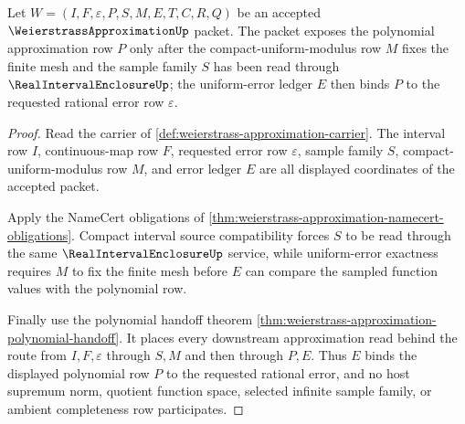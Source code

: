 \begin{theorem}
\label{thm:weierstrass-polynomial-modulus-ledger}
Let $W=(I,F,\varepsilon,P,S,M,E,T,C,R,Q)$ be an accepted $\WeierstrassApproximationUp$ packet. The packet exposes the polynomial approximation row $P$ only after the compact-uniform-modulus row $M$ fixes the finite mesh and the sample family $S$ has been read through $\RealIntervalEnclosureUp$; the uniform-error ledger $E$ then binds $P$ to the requested rational error row $\varepsilon$.
\end{theorem}
\begin{proof}
Read the carrier of \autoref{def:weierstrass-approximation-carrier}. The interval row $I$, continuous-map row $F$, requested error row $\varepsilon$, sample family $S$, compact-uniform-modulus row $M$, and error ledger $E$ are all displayed coordinates of the accepted packet.

Apply the NameCert obligations of \autoref{thm:weierstrass-approximation-namecert-obligations}. Compact interval source compatibility forces $S$ to be read through the same $\RealIntervalEnclosureUp$ service, while uniform-error exactness requires $M$ to fix the finite mesh before $E$ can compare the sampled function values with the polynomial row.

Finally use the polynomial handoff theorem \autoref{thm:weierstrass-approximation-polynomial-handoff}. It places every downstream approximation read behind the route from $I,F,\varepsilon$ through $S,M$ and then through $P,E$. Thus $E$ binds the displayed polynomial row $P$ to the requested rational error, and no host supremum norm, quotient function space, selected infinite sample family, or ambient completeness row participates.
\end{proof}


